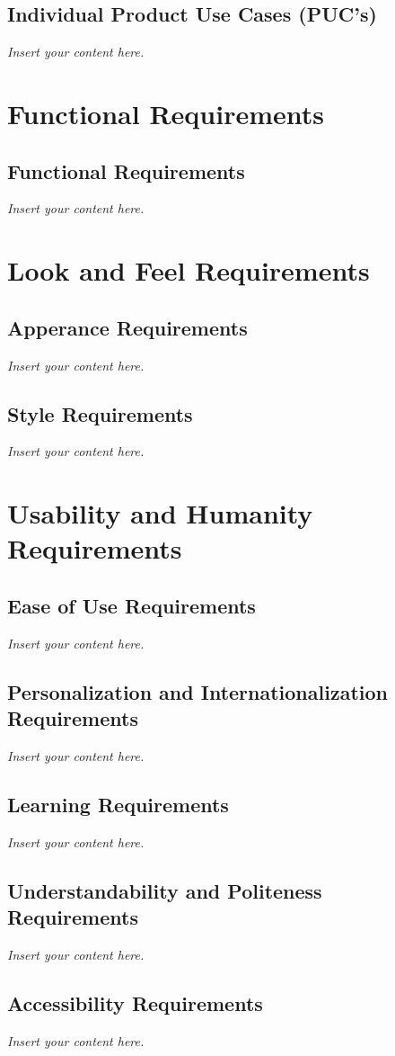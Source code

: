 \documentclass[a4paper, 12pt,twoside]{article}
\newcommand{\lips}{\textit{Insert your content here.}}
\begin{document}
\subsection{Individual Product Use Cases (PUC's)}
\lips

\section{Functional Requirements}
\subsection{Functional Requirements}
\lips

\section{Look and Feel Requirements}
\subsection{Apperance Requirements}
\lips
\subsection{Style Requirements}
\lips

\section{Usability and Humanity Requirements}
\subsection{Ease of Use Requirements}
\lips
\subsection{Personalization and Internationalization Requirements}
\lips
\subsection{Learning Requirements}
\lips
\subsection{Understandability and Politeness Requirements}
\lips
\subsection{Accessibility Requirements}
\lips
\end{document}
